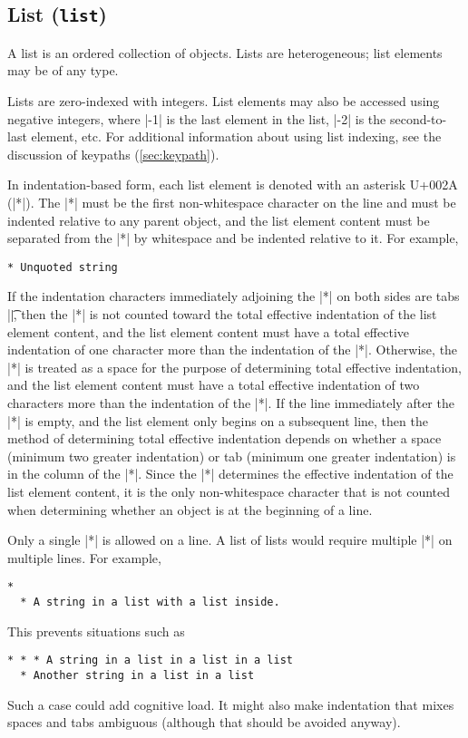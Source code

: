 \documentclass[11pt]{article}
\begin{document}
\subsection{List (\texttt{list})}

A list is an ordered collection of objects.  Lists are heterogeneous; list elements may be of any type.

Lists are zero-indexed with integers.  List elements may also be accessed using negative integers, where |-1| is the last element in the list, |-2| is the second-to-last element, etc.  For additional information about using list indexing, see the discussion of keypaths (\cref{sec:keypath}).

In indentation-based form, each list element is denoted with an asterisk U+002A (|*|).  The |*| must be the first non-whitespace character on the line and must be indented relative to any parent object, and the list element content must be separated from the |*| by whitespace and be indented relative to it.  For example,
\begin{Verbatim}
* Unquoted string
\end{Verbatim}
If the indentation characters immediately adjoining the |*| on both sides are tabs |\t|, then the |*| is not counted toward the total effective indentation of the list element content, and the list element content must have a total effective indentation of one character more than the indentation of the |*|.  Otherwise, the |*| is treated as a space for the purpose of determining total effective indentation, and the list element content must have a total effective indentation of two characters more than the indentation of the |*|.  If the line immediately after the |*| is empty, and the list element only begins on a subsequent line, then the method of determining total effective indentation depends on whether a space (minimum two greater indentation) or tab (minimum one greater indentation) is in the column of the |*|.  Since the |*| determines the effective indentation of the list element content, it is the only non-whitespace character that is not counted when determining whether an object is at the beginning of a line.

Only a single |*| is allowed on a line.  A list of lists would require multiple |*| on multiple lines.  For example,
\begin{Verbatim}
*
  * A string in a list with a list inside.
\end{Verbatim}
This prevents situations such as
\begin{Verbatim}
* * * A string in a list in a list in a list
  * Another string in a list in a list
\end{Verbatim}
Such a case could add cognitive load.  It might also make indentation that mixes spaces and tabs ambiguous (although that should be avoided anyway).
\end{document}
